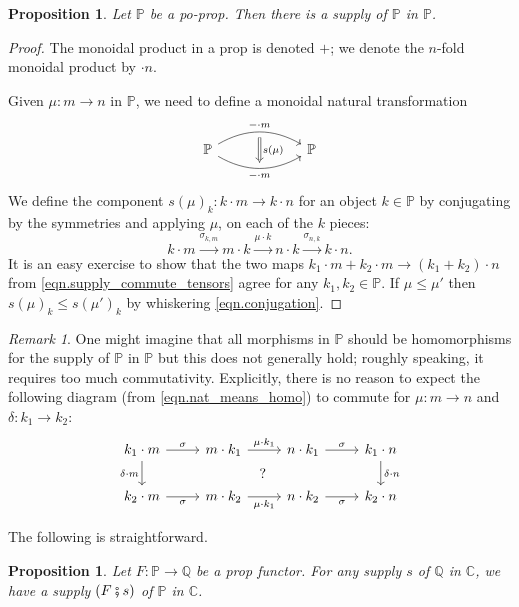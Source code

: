 \documentclass[11pt, oneside, article]{memoir}
\theoremstyle{plain}
\newtheorem{proposition}[theorem]{Proposition}
\theoremstyle{definition}
\theoremstyle{remark}
\newtheorem{remark}[theorem]{Remark}
\newcommand{\ccat}[1]{\mathbb{#1}}%
\newcommand{\cc}{\mathbb{C}}
\newcommand{\pp}{\mathbb{P}}
\newcommand{\cp}{\mathbin{\fatsemi}}
\newcommand{\To}[1]{\xrightarrow{#1}}
\begin{document}
\begin{proposition}\label{prop.p_supplies_itself}
Let $\pp$ be a po-prop. Then there is a supply of $\pp$ in $\pp$.
\end{proposition}
\begin{proof}
The monoidal product in a prop is denoted $+$; we denote the $n$-fold monoidal product by $\cdot n$.

Given $\mu\colon m\to n$ in $\pp$, we need to define a monoidal natural transformation
\[
\begin{tikzcd}[column sep=60pt]
	\pp\ar[r, bend left, "-\cdot m" name=m]\ar[r, bend right, "-\cdot m"' name=n]&
	\pp
	\ar[from=m, to=n, Rightarrow, shorten <=4pt, shorten >=4pt, "s(\mu)"]
\end{tikzcd}
\]
We define the component $s(\mu)_k\colon k\cdot m\to k\cdot n$ for an object $k\in\pp$ by conjugating by the symmetries and applying $\mu$, on each of the $k$ pieces:
\begin{equation}\label{eqn.conjugation}
	k\cdot m\To{\sigma_{k,m}}
	m\cdot k\To{\mu\cdot k}
	n\cdot k\To{\sigma_{n,k}}
	k\cdot n.
\end{equation}
It is an easy exercise to show that the two maps $k_1\cdot m+k_2\cdot m\to (k_1+k_2)\cdot n$ from \cref{eqn.supply_commute_tensors} agree for any $k_1,k_2\in\pp$. If $\mu\leq\mu'$ then $s(\mu)_k\leq s(\mu')_k$ by whiskering \cref{eqn.conjugation}.
\end{proof}

\begin{remark}
One might imagine that all morphisms in $\pp$ should be homomorphisms for the supply of $\pp$ in $\pp$ but this does not generally hold; roughly speaking, it requires too much commutativity. Explicitly, there is no reason to expect the following diagram (from \cref{eqn.nat_means_homo}) to commute for $\mu\colon m\to n$ and $\delta\colon k_1\to k_2$:
\[
\begin{tikzcd}
  k_1\cdot m\ar[r, "\sigma"]\ar[d, "\delta\cdot m"']&
  m\cdot k_1\ar[r, "\mu\cdot k_1"]\ar[dr, phantom, "?"]&
  n\cdot k_1\ar[r, "\sigma"]&
  k_1\cdot n\ar[d, "\delta\cdot n"]\\
  k_2\cdot m\ar[r, "\sigma"']&
  m\cdot k_2\ar[r, "\mu\cdot k_1"']&
  n\cdot k_2\ar[r, "\sigma"']&
  k_2\cdot n
\end{tikzcd}
\]
\end{remark}


The following is straightforward.
\begin{proposition}\label{prop.change_of_supply}
Let $F\colon\ccat{P}\to\ccat{Q}$ be a prop functor. For any supply $s$ of $\ccat{Q}$ in $\cc$, we have a supply $(F\cp s)$ of $\pp$ in $\cc$.
\end{proposition}
\end{document}
